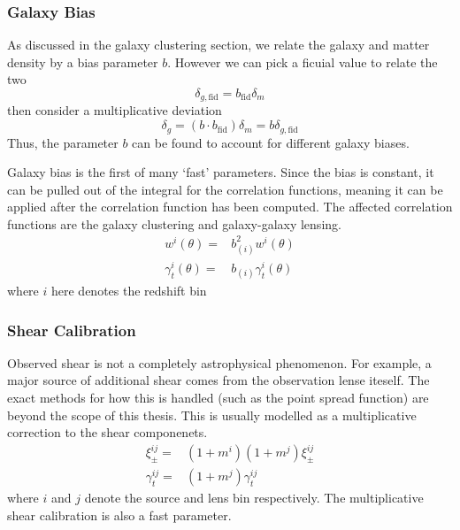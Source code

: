 \subsubsection{Galaxy Bias}
As discussed in the galaxy clustering section, we relate the galaxy and matter density by a bias parameter $b$. However we can pick a ficuial value to relate the two
\begin{equation}
	\delta_{g,\text{fid}} = b_{\text{fid}}\delta_m
\end{equation}
then consider a multiplicative deviation
\begin{equation}
	\delta_g = (b\cdot b_{\text{fid}})\delta_m = b\delta_{g,\text{fid}}
\end{equation}
Thus, the parameter $b$ can be found to account for different galaxy biases. 

Galaxy bias is the first of many `fast' parameters. Since the bias is constant, it can be pulled out of the integral for the correlation functions, meaning it can be applied after the correlation function has been computed. The affected correlation functions are the galaxy clustering and galaxy-galaxy lensing.
\begin{equation}
	\begin{split}
		w^i(\theta) =& b_{(i)}^2w^i(\theta) \\
		\gamma^i_t(\theta) =& b_{(i)}\gamma_t^i(\theta)
	\end{split}
\end{equation}
where $i$ here denotes the redshift bin
\subsubsection{Shear Calibration}
Observed shear is not a completely astrophysical phenomenon. For example, a major source of additional shear comes from the observation lense iteself. The exact methods for how this is handled (such as the point spread function) are beyond the scope of this thesis. This is usually modelled as a multiplicative correction to the shear componenets.
\begin{equation}
	\begin{split}
		\xi^{ij}_{\pm} =& (1+m^i)(1+m^j) \xi^{ij}_{\pm} \\
		\gamma^{ij}_t =& (1+m^j) \gamma_t^{ij}
	\end{split}
\end{equation}
where $i$ and $j$ denote the source and lens bin respectively. The multiplicative shear calibration is also a fast parameter.
